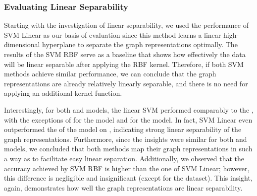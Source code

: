 \subsubsection{Evaluating Linear Separability}
Starting with the investigation of linear separability, we used the performance of \textsf{SVM Linear} as our basis of evaluation since this method learns a linear high-dimensional hyperplane to separate the graph representations optimally. The results of the \textsf{SVM RBF} serve as a baseline that shows how effectively the data will be linear separable after applying the \textsf{RBF} kernel. Therefore, if both \textsf{SVM} methods achieve similar performance, we can conclude that the graph representations are already relatively linearly separable, and there is no need for applying an additional kernel function.

Interestingly, for both \gnn and \wlnn models, the linear \textsf{SVM} performed comparably to the \mlp, with the exceptions of \enzymes for the \wlnn model and \nci for the \gnn model. In fact, \textsf{SVM Linear} even outperformed the \mlp of the \gnn model on \mutag, indicating strong linear separability of the graph representations. Furthermore, since the insights were similar for both \gnn and \wlnn models, we concluded that both methods map their graph representations in such a way as to facilitate easy linear separation. Additionally, we observed that the accuracy achieved by \textsf{SVM RBF} is higher than the one of \textsf{SVM Linear}; however, this difference is negligible and insignificant (except for the \enzymes dataset). This insight, again, demonstrates how well the graph representations are linear separability.

